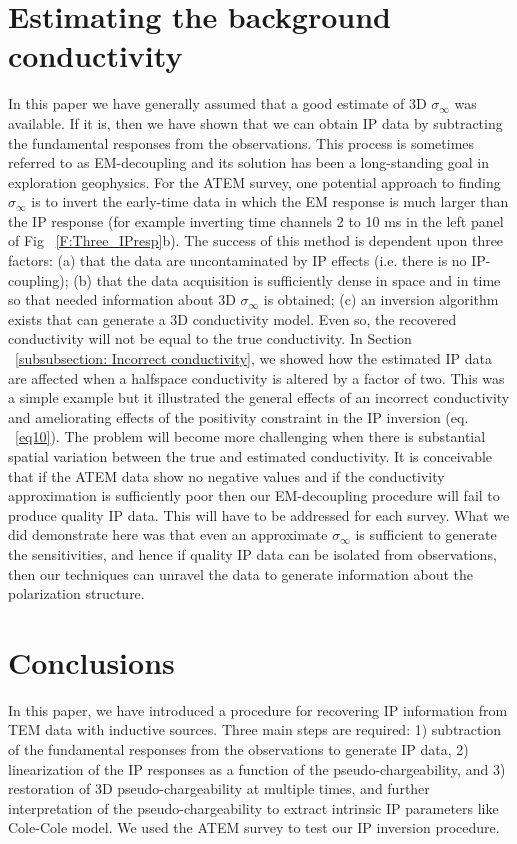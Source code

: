 \documentclass[extra,mreferee]{gji}
\newcommand{\siginf}{\sigma_\infty}
\begin{document}
\section{Estimating the background conductivity}
\label{section: Estimating the background conductivity}
In this paper we have generally assumed that a good estimate of 3D $\siginf$ was available. If it is, then we have shown that we can obtain IP data by subtracting the fundamental responses from the observations. This process is sometimes referred to as EM-decoupling and its solution has been a long-standing goal in exploration geophysics. For the ATEM survey, one potential approach to finding $\siginf$ is to invert the early-time data in which the EM response is much larger than the IP response (for example inverting time channels 2 to 10 ms in the left panel of Fig ~\ref{F:Three_IPresp}b). The success of this method is dependent upon three factors: (a) that the data are uncontaminated by IP effects (i.e. there is no IP-coupling); (b) that the data acquisition is sufficiently dense in space and in time so that needed information about 3D $\siginf$ is obtained; (c) an inversion algorithm exists that can generate a 3D conductivity model. Even so, the recovered conductivity will not be equal to the true conductivity. In Section ~\ref{subsubsection: Incorrect conductivity}, we showed how the estimated IP data are affected when a halfspace conductivity is altered by a factor of two. This was a simple example but it illustrated the general effects of an incorrect conductivity and ameliorating effects of the positivity constraint in the IP inversion (eq. ~\ref{eq10}). The problem will become more challenging when there is substantial spatial variation between the true and estimated conductivity. It is conceivable that if the ATEM data show no negative values and if the conductivity approximation is sufficiently poor then our EM-decoupling procedure will fail to produce quality IP data. This will have to be addressed for each survey. What we did demonstrate here was that even an approximate $\siginf$ is sufficient to generate the sensitivities, and hence if quality IP data can be isolated from observations, then our techniques can unravel the data to generate information about the polarization structure.

\section{Conclusions}
In this paper, we have introduced a procedure for recovering IP information from TEM data with inductive sources. Three main steps are required: 1) subtraction of the fundamental responses from the observations to generate IP data, 2) linearization of the IP responses as a function of the pseudo-chargeability, and 3) restoration of 3D pseudo-chargeability at multiple times, and further interpretation of the pseudo-chargeability to extract intrinsic IP parameters like Cole-Cole model. We used the ATEM survey to test our IP inversion procedure.
\end{document}
